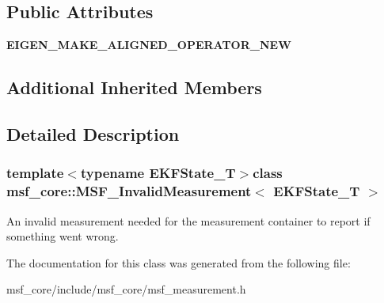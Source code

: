 \subsection*{Public Attributes}
\begin{DoxyCompactItemize}
\item 
\hypertarget{classmsf__core_1_1MSF__InvalidMeasurement_aa86e5b98f45256afded1bf30391dcce2}{{\bfseries E\-I\-G\-E\-N\-\_\-\-M\-A\-K\-E\-\_\-\-A\-L\-I\-G\-N\-E\-D\-\_\-\-O\-P\-E\-R\-A\-T\-O\-R\-\_\-\-N\-E\-W}}\label{classmsf__core_1_1MSF__InvalidMeasurement_aa86e5b98f45256afded1bf30391dcce2}

\end{DoxyCompactItemize}
\subsection*{Additional Inherited Members}


\subsection{Detailed Description}
\subsubsection*{template$<$typename E\-K\-F\-State\-\_\-\-T$>$class msf\-\_\-core\-::\-M\-S\-F\-\_\-\-Invalid\-Measurement$<$ E\-K\-F\-State\-\_\-\-T $>$}

An invalid measurement needed for the measurement container to report if something went wrong. 

The documentation for this class was generated from the following file\-:\begin{DoxyCompactItemize}
\item 
msf\-\_\-core/include/msf\-\_\-core/msf\-\_\-measurement.\-h\end{DoxyCompactItemize}
